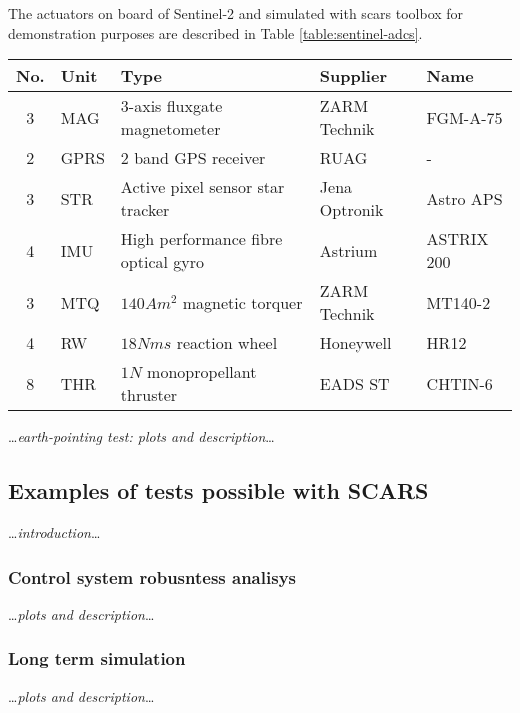     The actuators on board of Sentinel-2 and simulated with \ac{scars} toolbox for demonstration purposes are described in Table \ref{table:sentinel-adcs}.

        
    \begin{center}    
        \small
        \begin{tabularx}{\textwidth}{ c l X l l }
            \textbf{No.} & \textbf{Uni}t & \textbf{Type} & \textbf{Supplier} & \textbf{Name} \\ \hline
            3 & MAG & 3-axis fluxgate magnetometer & ZARM Technik & FGM-A-75 \\
            2 & GPRS & 2 band GPS receiver & RUAG & - \\
            3 & STR  & Active pixel sensor star tracker & Jena Optronik & Astro APS \\
            4 & IMU & High performance fibre optical gyro & Astrium & ASTRIX 200 \\
            3 & MTQ & $140 Am^2$ magnetic torquer & ZARM Technik & MT140-2\\
            4 & RW & $18 Nms$ reaction wheel & Honeywell & HR12 \\
            8 & THR & $1N$ monopropellant thruster & EADS ST &CHTIN-6
        \end{tabularx}
    \end{center}\label{table:sentinel-adcs}

    \dots\textit{earth-pointing test: plots and description}\dots

\subsection{Examples of tests possible with SCARS}
    \dots\textit{introduction}\dots

    \subsubsection{Control system robusntess analisys}
    
        \dots\textit{plots and description}\dots
        

    \subsubsection{Long term simulation}
        \dots\textit{plots and description}\dots

